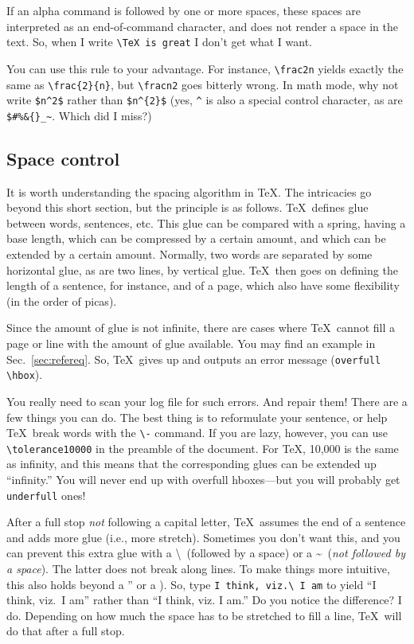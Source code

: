 \documentclass{article}
\begin{document}
If an alpha command is followed by one or more spaces, these spaces are interpreted as an end-of-command
character, and does not render a space in the text.  So, when I write \verb+\TeX is great+ I don't
get what I want.

You can use this rule to your advantage.  For instance, \verb+\frac2n+ yields exactly the
same as \verb+\frac{2}{n}+, but \verb+\fracn2+ goes bitterly wrong.  In math mode,
why not write \verb+$n^2$+ rather than \verb+$n^{2}$+ (yes, \verb+^+ is also a special
control character, as are \verb+$#%&{}_~+.  Which did I miss?)
 
\subsection{Space control}
It is worth understanding the spacing algorithm in \TeX. The intricacies go beyond this short section,
but the principle is as follows.  \TeX\ defines glue between words, sentences, etc.  This glue can
be compared with a spring, having a base length, which can be compressed by a certain amount,
and which can be extended by a certain amount.  Normally, two words are separated by some 
horizontal glue, as are two lines, by vertical glue.  \TeX\ then goes on defining the length of a sentence,
for instance, and of a page, which also have some flexibility (in the order of picas).

Since the amount of glue is not infinite, there are cases where \TeX\ cannot fill a page or line
with the amount of glue available.  You may find an example in Sec.~\ref{sec:refereq}.
So, \TeX\ gives up and outputs an error message (\verb+overfull \hbox+).

You really need to scan your log file for such errors.  And repair them!  There are a few things
you can do.  The best thing is to reformulate your sentence, or help \TeX\ break words
with the \verb+\-+ command.  If you are lazy, however, you can use \verb+\tolerance10000+
in the preamble of the document.  For \TeX, 10,000 is the same as infinity, and this means that
the corresponding glues can be extended up ``infinity.''  You will never end up with overfull
hboxes---but you will probably get \verb+underfull+ ones!

After a full stop \textsl{not} following a capital letter, \TeX\ assumes the end of a sentence
and adds more glue (i.e., more stretch).  Sometimes you don't want this, and you can prevent
this extra glue with a \textbackslash\ (followed by a space) or a \textasciitilde\ (\textsl{not followed by a space}).
The latter does not break along lines.
To make things more intuitive, this also holds beyond a '' or a ).  So, type
\verb+I think, viz.\ I am+
to yield ``I think, viz.\ I am''
rather than ``I think, viz. I am.''
Do you notice the difference?  I do.  Depending on how much the space has to be stretched to fill
a line, \TeX\ will do that after a full stop.
\end{document}
